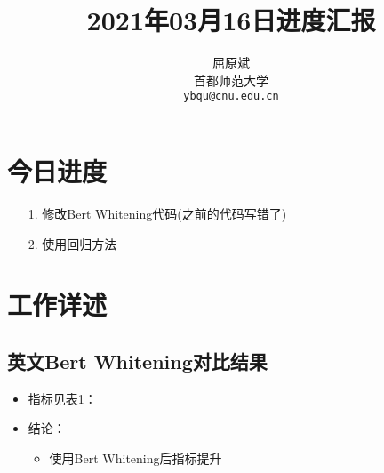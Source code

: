 \documentclass[11pt]{article}
\title{2021年03月16日进度汇报}
\author{屈原斌 \\
  首都师范大学 \\
    {\tt ybqu@cnu.edu.cn}}
\date{}
\begin{document}
\begin{CJK}{UTF8}{gkai}

\maketitle
\CJKindent


\section{今日进度}


\begin{itemize}
\item [1.] 修改Bert Whitening代码(之前的代码写错了)
\item [2.] 使用回归方法
\end{itemize}

\section{工作详述}
\subsection{英文Bert Whitening对比结果}

\begin{itemize}
  \item 指标见表1：
  \item 结论：
  \begin{itemize}
    \item 使用Bert Whitening后指标提升
  \end{itemize}
\end{itemize}



\end{CJK}
\end{document}
